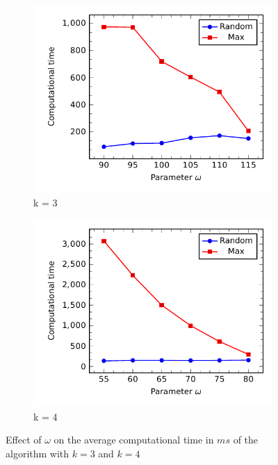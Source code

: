 %
\begin{figure}[!h]
	\begin{subfigure}[t]{.5\textwidth}
		\centering
		\includegraphics[scale=.8]{Hinhanh/OmegaEffect/time/k3.pdf}		
		\caption{k = 3}
	\end{subfigure}
	\begin{subfigure}[t]{.5\textwidth}
		\centering
		\includegraphics[scale=.8]{Hinhanh/OmegaEffect/time/k4.pdf}		
		\caption{k = 4}
	\end{subfigure}
\caption{Effect of $\omega$ on the average computational time in $ms$ of the algorithm with $k = 3$ and $k = 4$}
\label{fig:wt}
\end{figure}
